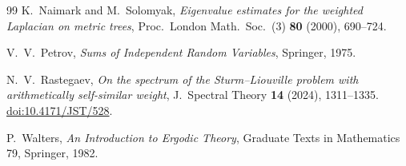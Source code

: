 \documentclass[11pt]{article}
\theoremstyle{definition}
\theoremstyle{remark}
\begin{document}
\begin{thebibliography}{99}
K.~Naimark and M.~Solomyak,
\emph{Eigenvalue estimates for the weighted Laplacian on metric trees},
Proc.\ London Math.\ Soc.\ (3) \textbf{80} (2000), 690--724.

V.~V.~Petrov, \emph{Sums of Independent Random Variables},
Springer, 1975.

N.~V.~Rastegaev,
\emph{On the spectrum of the Sturm--Liouville problem with arithmetically
self-similar weight}, J.\ Spectral Theory \textbf{14} (2024), 1311--1335.
\href{https://doi.org/10.4171/JST/528}{doi:10.4171/JST/528}.

P.~Walters, \emph{An Introduction to Ergodic Theory},
Graduate Texts in Mathematics 79, Springer, 1982.
\end{thebibliography}
\end{document}
